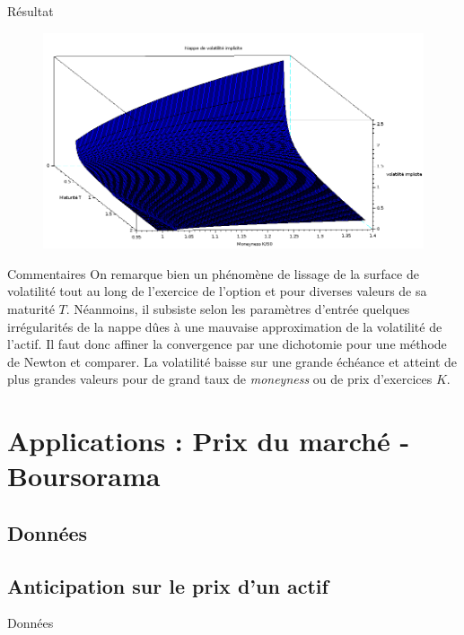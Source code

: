 \documentclass{beamer}
\begin{document}
\begin{frame}{Résultat}
    \begin{figure}
      \vspace{-0.8cm}
      \includegraphics[scale=0.35]{volimpl2.png}
    \end{figure}
\end{frame}

\begin{frame}{Commentaires}
  On remarque bien un phénomène de lissage de la surface de volatilité tout au long de l'exercice de l'option et pour diverses valeurs de sa maturité $T$.
  \newline
  Néanmoins, il subsiste selon les paramètres d'entrée quelques irrégularités de la nappe dûes à une mauvaise approximation de la volatilité de l'actif. Il faut donc affiner la convergence par une dichotomie pour une méthode de Newton et comparer.
  \newline
  La volatilité baisse sur une grande échéance et atteint de plus grandes valeurs pour de grand taux de \textit{moneyness} ou de prix d'exercices $K$.
\end{frame}
\section{Applications : Prix du marché - Boursorama}
\subsection{Données}
\subsection{Anticipation sur le prix d'un actif}


\begin{frame}{Données}
\end{frame}
\end{document}
